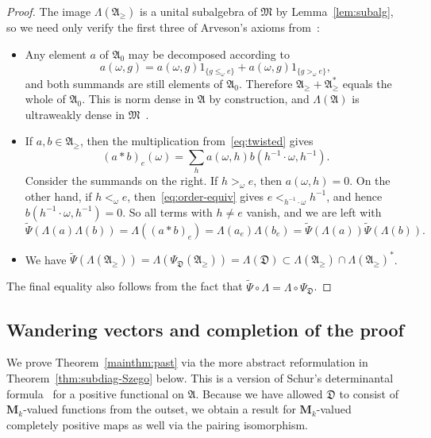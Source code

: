 \documentclass[12pt,a4paper]{article}
\numberwithin{equation}{section}
\theoremstyle{remark}
\newcommand{\rmM}{\mathbf{M}}
\newcommand{\A}{\mathfrak{A}}
\newcommand{\frD}{\mathfrak{D}}
\newcommand{\M}{\mathfrak{M}}
\renewcommand{\L}{\Lambda}
\renewcommand{\t}[1]{\widetilde{#1}}
\begin{document}
\begin{proof}
The image $\L(\A_\ge)$ is a unital subalgebra of $\M$ by Lemma~\ref{lem:subalg}, so we need only verify the first three of Arveson's axioms from~\cite[Def. 2.1.1]{Arv67}:
\begin{itemize}
\item[i.] Any element $a$ of $\A_0$ may be decomposed according to
\[a(\omega,g) = a(\omega,g)1_{\{g \le_\omega e\}} + a(\omega,g) 1_{\{g >_\omega e\}},\]
and both summands are still elements of $\A_0$.  Therefore $\A_\ge + \A_\ge^\ast$ equals the whole of $\A_0$.  This is norm dense in $\A$ by construction, and $\L(\A)$ is ultraweakly dense in $\M$~\cite[Thm. I.3.2]{Dix--vN}.
\item[ii.] If $a,b \in \A_{\ge}$, then the multiplication from~\eqref{eq:twisted} gives
\[(a\ast b)_e(\omega) = \sum_h a(\omega,h)b(h^{-1}\cdot \omega,h^{-1}).\]
Consider the summands on the right.  If $h >_\omega e$, then $a(\omega,h) = 0$.  On the other hand, if $h <_\omega e$, then~\eqref{eq:order-equiv} gives $e <_{h^{-1}\cdot \omega} h^{-1}$, and hence ${b(h^{-1}\cdot \omega,h^{-1}) = 0}$.  So all terms with $h\ne e$ vanish, and we are left with
\[\t{\Psi}(\L(a)\L(b)) = \L((a\ast b)_e) = \L(a_e)\L(b_e) = \t{\Psi}(\L(a))\t{\Psi}(\L(b)).\]
\item[iii.] We have $\t{\Psi}(\L(\A_\ge)) = \L(\Psi_\frD(\A_\ge)) = \L(\frD) \subset \L(\A_\ge) \cap \L(\A_\ge)^\ast$.
\end{itemize}
The final equality also follows from the fact that $\t{\Psi}\circ \L = \L\circ  \Psi_\frD$.
\end{proof}





\subsection{Wandering vectors and completion of the proof}

We prove Theorem~\ref{mainthm:past} via the more abstract reformulation in Theorem~\ref{thm:subdiag-Szego} below.  This is a version of Schur's determinantal formula~\cite[Subs. 0.8.5]{HorJohMA} for a positive functional on $\A$.  Because we have allowed $\frD$ to consist of $\rmM_k$-valued functions from the outset, we obtain a result for $\rmM_k$-valued completely positive maps as well via the pairing isomorphism.
\end{document}

